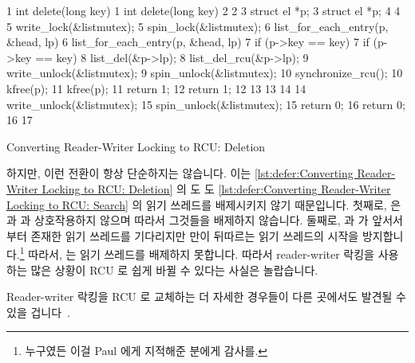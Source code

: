 \begin{listing*}[htbp]
{ \scriptsize
\begin{verbbox}
 1 int delete(long key)                  1 int delete(long key)
 2 {                                     2 {
 3   struct el *p;                       3   struct el *p;
 4                                       4
 5   write_lock(&listmutex);             5   spin_lock(&listmutex);
 6   list_for_each_entry(p, &head, lp) { 6   list_for_each_entry(p, &head, lp) {
 7     if (p->key == key) {              7     if (p->key == key) {
 8       list_del(&p->lp);               8       list_del_rcu(&p->lp);
 9       write_unlock(&listmutex);       9       spin_unlock(&listmutex);
                                        10       synchronize_rcu();
10       kfree(p);                      11       kfree(p);
11       return 1;                      12       return 1;
12     }                                13     }
13   }                                  14   }
14   write_unlock(&listmutex);          15   spin_unlock(&listmutex);
15   return 0;                          16   return 0;
16 }                                    17 }
\end{verbbox}
}
\hspace*{0.9in}\OneColumnHSpace{-0.5in}
\theverbbox
\caption{Converting Reader-Writer Locking to RCU: Deletion}
\label{lst:defer:Converting Reader-Writer Locking to RCU: Deletion}
\end{listing*}

하지만, 이런 전환이 항상 단순하지는 않습니다.
이는
\cref{lst:defer:Converting Reader-Writer Locking to RCU: Deletion}
의  도  도
\cref{lst:defer:Converting Reader-Writer Locking to RCU: Search}
의 읽기 쓰레드를 배제시키지 않기 때문입니다.
첫째로,  은  과  과
상호작용하지 않으며 따라서 그것들을 배제하지 않습니다.
둘째로,  과  가 앞서서부터 존재한 읽기
쓰레드를 기다리지만  만이 뒤따르는 읽기 쓰레드의 시작을
방지합니다.\footnote{
	누구였든 이걸 Paul 에게 지적해준 분에게 감사를.}
따라서,  는 읽기 쓰레드를 배제하지 못합니다.
따라서 reader-writer 락킹을 사용하는 많은 상황이 RCU 로 쉽게 바뀔 수 있다는
사실은 놀랍습니다.

Reader-writer 락킹을 RCU 로 교체하는 더 자세한 경우들이 다른 곳에서도 발견될 수
있을 겁니다~\cite{NeilBrown2015PathnameLookup,NeilBrown2015RCUwalk}.

\iffalse

